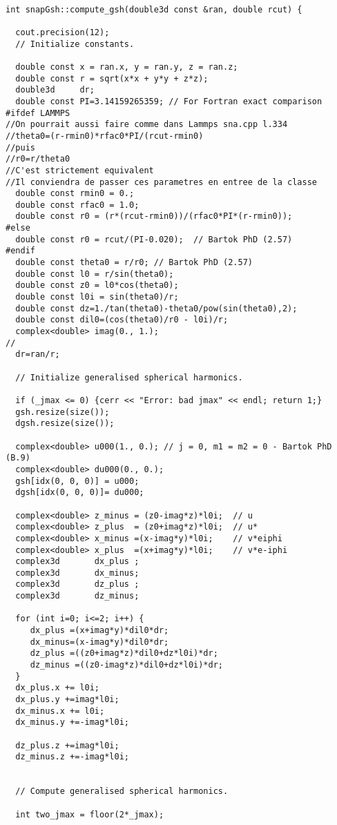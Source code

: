\documentclass[12pt]{article}
\begin{document}
        \begin{lstlisting}

int snapGsh::compute_gsh(double3d const &ran, double rcut) {

  cout.precision(12);
  // Initialize constants.

  double const x = ran.x, y = ran.y, z = ran.z;
  double const r = sqrt(x*x + y*y + z*z);
  double3d     dr;
  double const PI=3.14159265359; // For Fortran exact comparison
#ifdef LAMMPS
//On pourrait aussi faire comme dans Lammps sna.cpp l.334
//theta0=(r-rmin0)*rfac0*PI/(rcut-rmin0)
//puis
//r0=r/theta0
//C'est strictement equivalent
//Il conviendra de passer ces parametres en entree de la classe
  double const rmin0 = 0.;
  double const rfac0 = 1.0;
  double const r0 = (r*(rcut-rmin0))/(rfac0*PI*(r-rmin0));
#else
  double const r0 = rcut/(PI-0.020);  // Bartok PhD (2.57)
#endif
  double const theta0 = r/r0; // Bartok PhD (2.57)
  double const l0 = r/sin(theta0);
  double const z0 = l0*cos(theta0);
  double const l0i = sin(theta0)/r;
  double const dz=1./tan(theta0)-theta0/pow(sin(theta0),2);
  double const dil0=(cos(theta0)/r0 - l0i)/r;
  complex<double> imag(0., 1.);
//
  dr=ran/r;

  // Initialize generalised spherical harmonics.

  if (_jmax <= 0) {cerr << "Error: bad jmax" << endl; return 1;}
  gsh.resize(size());
  dgsh.resize(size());

  complex<double> u000(1., 0.); // j = 0, m1 = m2 = 0 - Bartok PhD (B.9)
  complex<double> du000(0., 0.);
  gsh[idx(0, 0, 0)] = u000;
  dgsh[idx(0, 0, 0)]= du000;

  complex<double> z_minus = (z0-imag*z)*l0i;  // u
  complex<double> z_plus  = (z0+imag*z)*l0i;  // u*
  complex<double> x_minus =(x-imag*y)*l0i;    // v*eiphi
  complex<double> x_plus  =(x+imag*y)*l0i;    // v*e-iphi
  complex3d       dx_plus ; 
  complex3d       dx_minus;
  complex3d       dz_plus ;
  complex3d       dz_minus;

  for (int i=0; i<=2; i++) {
     dx_plus =(x+imag*y)*dil0*dr;
     dx_minus=(x-imag*y)*dil0*dr;
     dz_plus =((z0+imag*z)*dil0+dz*l0i)*dr;
     dz_minus =((z0-imag*z)*dil0+dz*l0i)*dr;
  }
  dx_plus.x += l0i;
  dx_plus.y +=imag*l0i;
  dx_minus.x += l0i;
  dx_minus.y +=-imag*l0i;

  dz_plus.z +=imag*l0i;
  dz_minus.z +=-imag*l0i;


  // Compute generalised spherical harmonics.

  int two_jmax = floor(2*_jmax);


\end{lstlisting}
\end{document}
